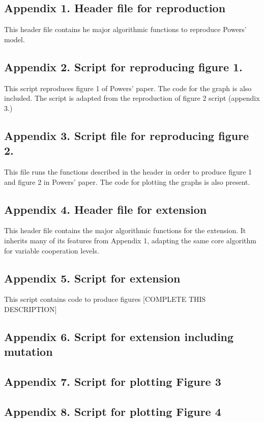 \documentclass[a4paper,10pt, twocolumn]{article}
\begin{document}
\subsection{Appendix 1. Header file for reproduction}
This header file contains he major algorithmic functions to reproduce Powers' model. 

\subsection{Appendix 2. Script for reproducing figure 1.}
This script reproduces figure 1 of Powers' paper. The code for the graph is also included. The script is adapted from the reproduction of figure 2 script (appendix 3.)

\subsection{Appendix 3. Script file for reproducing figure 2.}
This file runs the functions described in the header in order to produce figure 1 and figure 2 in Powers' paper. The code for plotting the graphs is also present. 

\subsection{Appendix 4. Header file for extension}
This header file contains the major algorithmic functions for the extension. It inherits many of its features from Appendix 1, adapting the same core algorithm for variable cooperation levels. 

\subsection{Appendix 5. Script for extension}
This script contains code to produce figures [COMPLETE THIS DESCRIPTION]

\subsection{Appendix 6. Script for extension including mutation}

\subsection{Appendix 7. Script for plotting Figure 3}

\subsection{Appendix 8. Script for plotting Figure 4}

\end{document}
